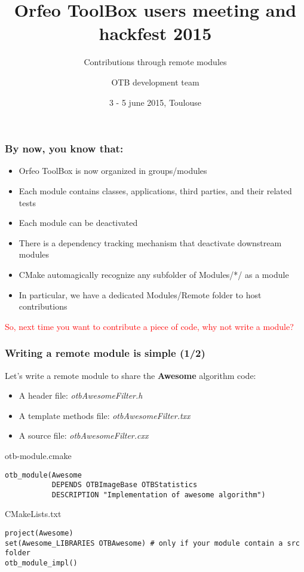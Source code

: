 \documentclass[8pt]{beamer}
\title{Orfeo ToolBox users meeting and hackfest 2015}
\subtitle{Contributions through remote modules}
\author{OTB development team}%
\date{3 - 5 june 2015, Toulouse}
\begin{document}
\begin{frame}
\titlepage
\end{frame}

\begin{frame}
\frametitle{By now, you know that:}
\begin{itemize}
\item Orfeo ToolBox is now organized in groups/modules
\item Each module contains classes, applications, third parties, and their related tests
\item Each module can be deactivated
\item There is a dependency tracking mechanism that deactivate downstream modules
\item CMake automagically recognize any subfolder of Modules/*/ as a module
\item In particular, we have a dedicated Modules/Remote folder to host contributions
\end{itemize}

\textcolor{red}{So, next time you want to contribute a piece of code, why not write a module?}


\end{frame}

\begin{frame}[fragile]
\frametitle{Writing a remote module is simple (1/2)}
Let's write a remote module to share the \textbf{Awesome} algorithm code:
\begin{itemize}
\item A header file: \textit{otbAwesomeFilter.h}
\item A template methods file: \textit{otbAwesomeFilter.txx}
\item A source file: \textit{otbAwesomeFilter.cxx}
\end{itemize}

\begin{block}{otb-module.cmake}
\begin{small}
\begin{verbatim}
otb_module(Awesome 
           DEPENDS OTBImageBase OTBStatistics 
           DESCRIPTION "Implementation of awesome algorithm")
\end{verbatim}
\end{small}
\end{block}

\begin{block}{CMakeLists.txt}
\begin{small}
\begin{verbatim}
project(Awesome)
set(Awesome_LIBRARIES OTBAwesome) # only if your module contain a src folder
otb_module_impl()
\end{verbatim}
\end{small}
\end{block}
\end{frame}
\end{document}
